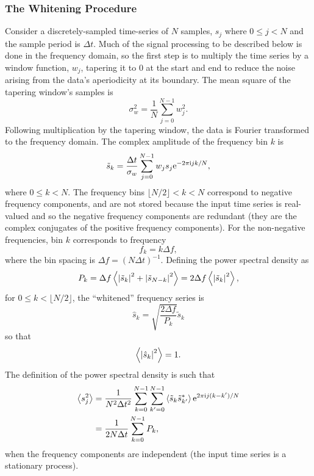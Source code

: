 \documentclass{article}
\begin{document}
\subsubsection{The Whitening Procedure}


Consider a discretely-sampled time-series of \(N\) samples, \(s_j\) where
\(0 \leq j < N\) and the sample period is \(\Delta t\).  Much of the signal
processing to be described below is done in the frequency domain, so the
first step is to multiply the time series by a window function, \(w_{j}\),
tapering it to 0 at the start and end to reduce the noise arising from the
data's aperiodicity at its boundary.  The mean square of the tapering
window's samples is
\begin{equation}
\sigma_{w}^{2}
   = \frac{1}{N} \sum_{j = 0}^{N - 1} w_{j}^2.
\end{equation}
Following multiplication by the tapering window, the data is Fourier
transformed to the frequency domain.  The complex amplitude of the
frequency bin \(k\) is
\begin{equation}
\tilde{s}_{k}
   = \frac{\Delta t}{\sigma_{w}} \sum_{j = 0}^{N - 1} w_{j} s_{j} \mathrm{e}^{-2
   \pi \mathrm{i} j k / N},
\end{equation}
where \(0 \leq k < N\).  The frequency bins \(\lfloor N / 2 \rfloor < k <
N\) correspond to negative frequency components, and are not stored because
the input time series is real-valued and so the negative frequency
components are redundant (they are the complex conjugates of the positive
frequency components).  For the non-negative frequencies, bin \(k\)
corresponds to frequency
\begin{equation}
f_{k}
   = k \Delta f,
\end{equation}
where the bin spacing is \(\Delta f = (N \Delta t)^{-1}\).  Defining the
power spectral density as
\begin{equation}
P_{k}
   = \Delta f \left\langle\left|\tilde{s}_{k}\right|^{2} + \left|\tilde{s}_{N
   - k}\right|^{2}\right\rangle
   = 2 \Delta f \left\langle\left|\tilde{s}_{k}\right|^{2}\right\rangle,
\end{equation}
for \(0 \leq k < \lfloor N / 2 \rfloor\), the ``whitened'' frequency series
is
\begin{equation}
\hat{s}_{k}
   = \sqrt{\frac{2 \Delta f}{P_{k}}} \tilde{s}_{k}
\end{equation}
so that
\begin{equation}
\label{eqn3}
\left\langle\left|\hat{s}_{k}\right|^2\right\rangle
   = 1.
\end{equation}
The definition of the power spectral density is such that
\begin{align}
\left\langle s_{j}^{2}\right\rangle
   & = \frac{1}{N^{2} \Delta t^{2}} \sum_{k = 0}^{N - 1} \sum_{k' = 0}^{N -
   1} \left\langle\tilde{s}_{k} \tilde{s}^{*}_{k'}\right\rangle \mathrm{e}^{2 \pi \mathrm{i} j (k - k')
   / N}
   \\
   & = \frac{1}{2 N \Delta t} \sum_{k = 0}^{N - 1} P_{k},
\end{align}
when the frequency components are independent (the input time series is a
stationary process).
\end{document}
